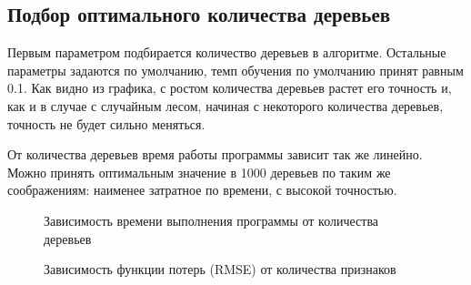 \documentclass[oneside,final,12pt]{article}
\begin{document}
\subsection {Подбор оптимального количества деревьев}
	Первым параметром подбирается количество деревьев в алгоритме. Остальные параметры задаются по умолчанию, темп обучения по умолчанию принят равным 0.1. Как видно из графика, с ростом количества деревьев растет его точность и, как и в случае с случайным лесом, начиная с некоторого количества деревьев, точность не будет сильно меняться.

	От количества деревьев время работы программы зависит так же линейно. Можно принять оптимальным значение в 1000 деревьев по таким же соображениям: наименее затратное по времени, с высокой точностью.

\begin{figure}[h!]
\caption{Зависимость времени выполнения программы от количества деревьев}
\label{fig:image8}
\end{figure}
\begin{figure}[h!]
\caption{Зависимость функции потерь (RMSE) от количества признаков}
\label{fig:image6}
\end{figure}
\end{document}
